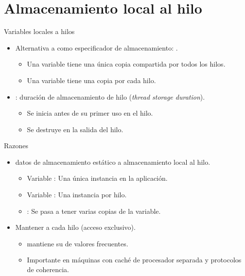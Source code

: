 \section{Almacenamiento local al hilo}

\begin{frame}[t]{Variables locales a hilos}
\begin{itemize}
  \item Alternativa a  como especificador de almacenamiento: .
    \begin{itemize}
      \item Una variable  tiene una única copia compartida por todos los hilos.
      \item Una variable  tiene una copia por cada hilo.
    \end{itemize}

  \item {}: duración de almacenamiento de hilo (\emph{thread storage duration}).
    \begin{itemize}
      \item Se inicia antes de su primer uso en el hilo.
      \item Se destruye en la salida del hilo.
    \end{itemize}
\end{itemize}
\end{frame}

\begin{frame}[t]{Razones}
\begin{itemize}
  \item {} datos de almacenamiento estático a almacenamiento local al hilo.
    \begin{itemize}
      \item Variable : Una única instancia en la aplicación.
      \item Variable : Una instancia por hilo.
      \item {}: Se pasa a tener varias copias de la variable.
    \end{itemize}

  \item Mantener   a cada hilo (acceso exclusivo).
    \begin{itemize}
      \item {} mantiene su  de valores frecuentes.
      \item Importante en máquinas con caché de procesador separada y protocolos de coherencia.
    \end{itemize}
\end{itemize}
\end{frame}

